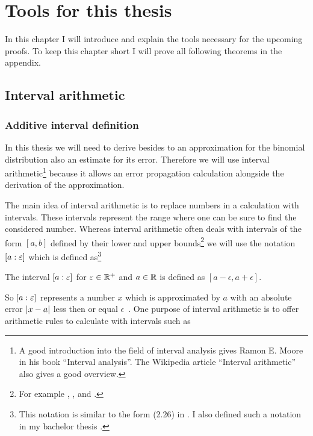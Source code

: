 \chapter{Tools for this thesis} \label{chapter:tools}

In this chapter I will introduce and explain the tools necessary for the upcoming proofs. To keep this chapter short I will prove all following theorems in the appendix.

\section{Interval arithmetic}

\subsection{Additive interval definition}

In this thesis we will need to derive besides to an approximation for the binomial distribution also an estimate for its error. Therefore we will use interval arithmetic\footnote{A good introduction into the field of interval analysis gives Ramon E. Moore in his book ``Interval analysis''\cite{moore}. The Wikipedia article ``Interval arithmetic''\cite{wikipedia:interval_arithmetic} also gives a good overview.} because it allows an error propagation calculation alongside the derivation of the approximation.

The main idea of interval arithmetic is to replace numbers in a calculation with intervals. These intervals represent the range where one can be sure to find the considered number. Whereas interval arithmetic often deals with intervals of the form $[a,b]$ defined by their lower and upper bounds\footnote{For example \cite[p.~5~ff.]{moore}, \cite[p.~9~ff.]{moore:methods}, \cite[p. 84 ff.]{kulisch} and \cite{wikipedia:interval_arithmetic}.} we will use the notation $\left[{a} : {\varepsilon}\right]$ which is defined as\footnote{This notation is similar to the form (2.26) in \cite[p. 14]{moore:methods}. I also defined such a notation in my bachelor thesis \cite[p. 19]{kulla}.}

\begin{definition}
  The interval $\left[{a} : {\varepsilon}\right]$ for $\varepsilon \in \mathbb R^{+}$ and $a\in \mathbb R$ is defined as $[a-\epsilon,a+\epsilon]$.
\end{definition}

So $\left[{a} : {\varepsilon}\right]$ represents a number $x$ which is approximated by $a$ with an absolute error $\left|{x-a}\right|$ less then or equal $\epsilon$~\cite[p.~5]{moore:methods}. One purpose of interval arithmetic is to offer arithmetic rules to calculate with intervals such as~\cite[pp.~19-20]{kulla}

